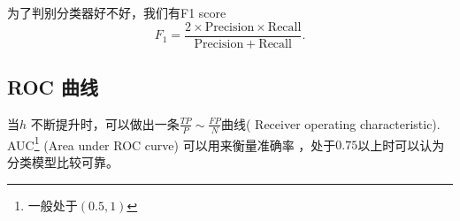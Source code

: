 为了判别分类器好不好，我们有F1 score
\[
F_1 = \frac{2 \times \mathrm{Precision} \times \mathrm{Recall}  }{ \mathrm{Precision} + \mathrm{Recall}  }
.\] 

\subsection{ROC 曲线}
当$h$ 不断提升时，可以做出一条$\frac{TP}{P} \sim \frac{FP}{N}$曲线(
Receiver operating characteristic).
AUC\footnote{一般处于$\left( 0.5,1 \right) $} (Area under ROC curve) 可以用来衡量准确率
，处于$0.75$以上时可以认为分类模型比较可靠。
